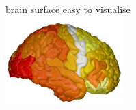 \documentclass[10pt,xcolor=table,aspectratio=169]{beamer}
\begin{document}
\begin{frame}[t]
\begin{figure}
\begin{subfigure}[t]{0.3\textwidth}
\myyes brain surface easy to visualise\\
\includegraphics[width=0.5\textwidth]{images/cortical-outer_0} 


\end{subfigure}

\end{figure}
 
\end{frame}
\end{document}
